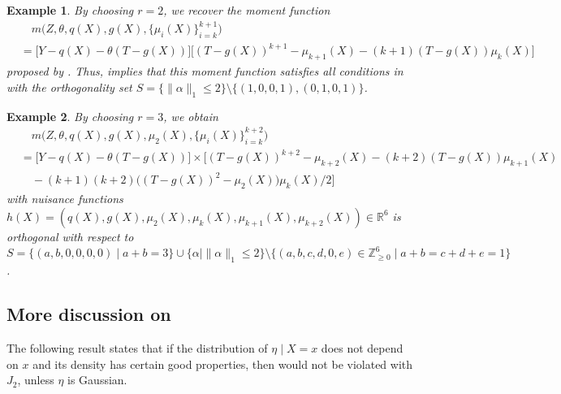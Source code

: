 \documentclass{article}
\newcommand{\R}{\mathbb{R}}
\newtheorem{example}{Example}[section]
\begin{document}
\begin{example}
    By choosing $r=2$, we recover the moment function
    \begin{equation}
        \begin{aligned}
            &\quad m\big(Z,\theta,q(X),g(X),\{\mu_i(X)\}_{i=k}^{k+1}\big) \\
            &= \big[ Y-q(X)-\theta(T-g(X)) \big] 
             \big[ (T-g(X))^{k+1}-\mu_{k+1}(X)-(k+1)(T-g(X))\mu_{k}(X) \big]
        \end{aligned}
    \end{equation}
    proposed by \citet{mackey2018orthogonal}. Thus,   implies that this moment function satisfies all conditions in   with the orthogonality set $S=\{\|\alpha\|_1\leq 2\}\setminus \{(1,0,0,1),(0,1,0,1)\}$.
\end{example}


\begin{example}
    By choosing $r=3$, we obtain
    \begin{equation}
        \begin{aligned}
            &\quad m\big(Z,\theta,q(X),g(X),\mu_2(X),\{\mu_i(X)\}_{i=k}^{k+2}\big) \\
            &= \big[ Y-q(X)-\theta(T-g(X)) \big] \times \big[ (T-g(X))^{k+2} -\mu_{k+2}(X)-(k+2)(T-g(X))\mu_{k+1}(X) \\
            &\quad - (k+1)(k+2)\big((T-g(X))^2-\mu_2(X)\big)\mu_{k}(X)/2 \big]
        \end{aligned}
    \end{equation}
    with nuisance functions $h(X)=(q(X),g(X),\mu_2(X),\mu_{k}(X),\mu_{k+1}(X),\mu_{k+2}(X))\in\R^6$
    is orthogonal with respect to $S=\{(a,b,0,0,0,0)\mid a+b=3\}\cup\{\alpha\mid \|\alpha\|_1\leq 2\}\setminus \{(a,b,c,d,0,e)\in\mathbb{Z}_{\geq 0}^6\mid a+b=c+d+e=1 \}$.
\end{example}

\subsection{More discussion on }
\label{subsec:asmp-suff-cond}

The following result states that if the distribution of $\eta\mid X=x$ does not depend on $x$ and its density has certain good properties, then  would not be violated with $J_2$, unless $\eta$ is Gaussian.
\end{document}
